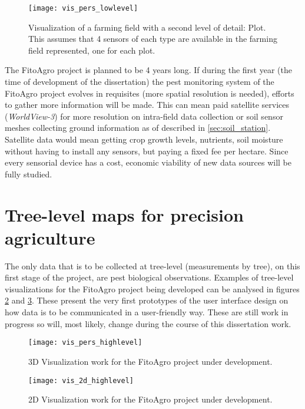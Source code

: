 \begin{figure}[htbp]
  \centering
  \texttt{[image: vis\_pers\_lowlevel]}
  \caption{Visualization of a farming field with a second level of detail: Plot. This assumes that 4 sensors of each type are available in the farming field represented, one for each plot.}
  \label{fig:vis_pers_lowlevel}
\end{figure}

The FitoAgro project is planned to be 4 years long. If during the first year (the time of development of the dissertation) the pest monitoring system of the FitoAgro project evolves in requisites (more spatial resolution is needed), efforts to gather more information will be made. This can mean paid satellite services (\textit{WorldView-3}) for more resolution on intra-field data collection or soil sensor meshes collecting ground information as of described in \ref{sec:soil_station}. Satellite data would mean getting crop growth levels, nutrients, soil moisture without having to install any sensors, but paying a fixed fee per hectare. Since every sensorial device has a cost, economic viability of new data sources will be fully studied.

\section{Tree-level maps for precision agriculture}

The only data that is to be collected at tree-level (measurements by tree), on this first stage of the project, are pest biological observations. Examples of tree-level visualizations for the FitoAgro project being developed can be analysed in figures \ref{fig:vis_pers_highlevel} and \ref{fig:vis_2d_highlevel}. These present the very first prototypes of the user interface design on how data is to be communicated in a user-friendly way. These are still work in progress so will, most likely, change during the course of this dissertation work.

\begin{figure}[htbp]
  \centering
  \texttt{[image: vis\_pers\_highlevel]}
  \caption{3D Visualization work for the FitoAgro project under development.}
  \label{fig:vis_pers_highlevel}
\end{figure}


\begin{figure}[htbp]
  \centering
  \texttt{[image: vis\_2d\_highlevel]}
  \caption{2D Visualization work for the FitoAgro project under development.}
  \label{fig:vis_2d_highlevel}
\end{figure}

